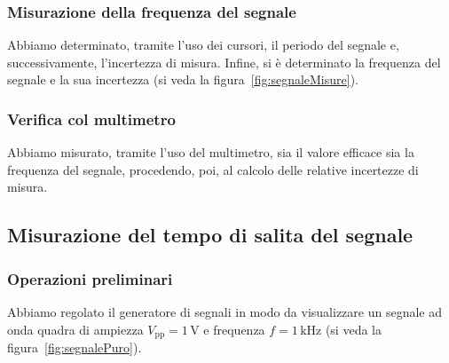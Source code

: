 \documentclass[a4paper]{article}
\begin{document}
			\subsubsection{Misurazione della frequenza del segnale}
				Abbiamo determinato, tramite l'uso dei cursori, il periodo del segnale e, successivamente, l'incertezza di misura. Infine, si è determinato la frequenza del segnale e la sua incertezza (si veda la figura~\ref{fig:segnaleMisure}).
			\subsubsection{Verifica col multimetro}
				Abbiamo misurato, tramite l'uso del multimetro, sia il valore efficace sia la frequenza del segnale, procedendo, poi, al calcolo delle relative incertezze di misura.
		\subsection{Misurazione del tempo di salita del segnale}
			\subsubsection{Operazioni preliminari}
				Abbiamo regolato il generatore di segnali in modo da visualizzare un segnale ad onda quadra di ampiezza $ V_{\mathrm{pp}} = 1 \, \mathrm{V} $ e frequenza $ f = 1 \, \mathrm{kHz} $ (si veda la figura~\ref{fig:segnalePuro}).
\end{document}
